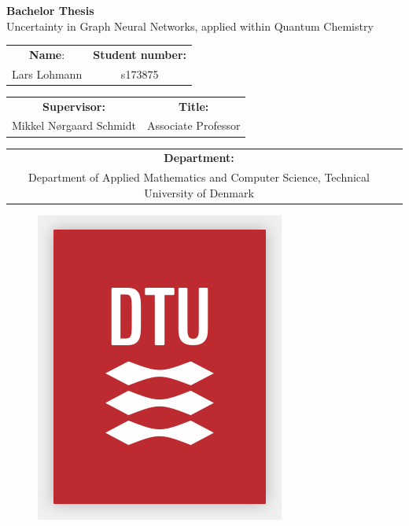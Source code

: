 \begin{center}

\vspace{40mm}

{\Huge \textbf{Bachelor Thesis}}\\[0.2cm]
{\large Uncertainty in Graph Neural Networks, applied within Quantum Chemistry}\\[0.2cm]

\vspace{20mm}

\begin{tabular}{cc}
\textbf{Name}: & \textbf{Student number:} \\ 

Lars Lohmann & s173875 \\
\end{tabular}

\vspace{30mm}

\begin{tabular}{cc}
\textbf{Supervisor:} & \textbf{Title:} \\
Mikkel Nørgaard Schmidt & Associate Professor\\
\end{tabular}

\vspace{20mm}

\begin{tabular}{cc}
\textbf{Department:}\\
Department of Applied Mathematics and Computer Science, Technical University of Denmark\\
\end{tabular}


\vspace{20mm}


\begin{figure}[H]
\centering
\includegraphics[width=8 cm]{Images/DTU_Logo_Hvid.jpg}
\end{figure}



\end{center} 




\pagebreak